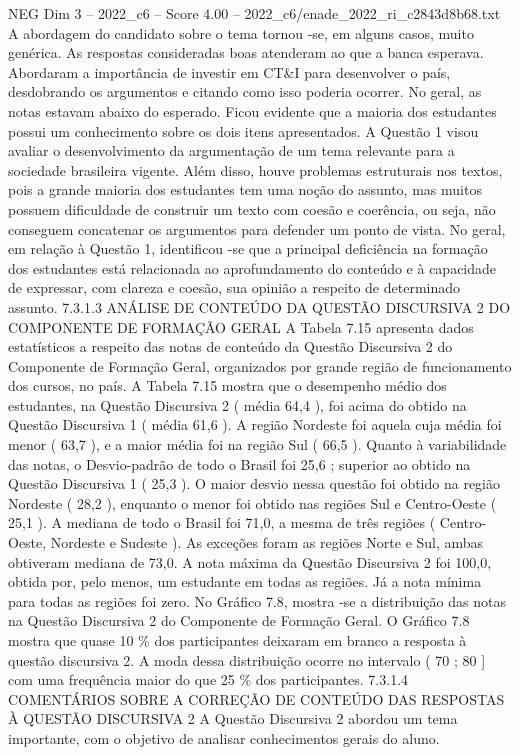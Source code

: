 \begin{textsample}{NEG Dim 3 – 2022\_c6 – Score 4.00 – 2022\_c6/enade\_2022\_ri\_c2843d8b68.txt}
A abordagem do candidato sobre o tema tornou -se, em alguns casos, muito genérica.
As respostas consideradas boas atenderam ao que a banca esperava.
Abordaram a importância de investir em CT\&I para desenvolver o país, desdobrando os argumentos e citando como isso poderia ocorrer.
No geral, as notas estavam abaixo do esperado.
Ficou evidente que a maioria dos estudantes possui um conhecimento sobre os dois itens apresentados.
A Questão 1 visou avaliar o desenvolvimento da argumentação de um tema relevante para a sociedade brasileira vigente.
Além disso, houve problemas estruturais nos textos, pois a grande maioria dos estudantes tem uma noção do assunto, mas muitos possuem dificuldade de construir um texto com coesão e coerência, ou seja, não conseguem concatenar os argumentos para defender um ponto de vista.
No geral, em relação à Questão 1, identificou -se que a principal deficiência na formação dos estudantes está relacionada ao aprofundamento do conteúdo e à capacidade de expressar, com clareza e coesão, sua opinião a respeito de determinado assunto. 7.3.1.3 ANÁLISE DE CONTEÚDO DA QUESTÃO DISCURSIVA 2 DO COMPONENTE DE FORMAÇÃO GERAL A Tabela 7.15 apresenta dados estatísticos a respeito das notas de conteúdo da Questão Discursiva 2 do Componente de Formação Geral, organizados por grande região de funcionamento dos cursos, no país.
A Tabela 7.15 mostra que o desempenho médio dos estudantes, na Questão Discursiva 2 ( média 64,4 ), foi acima do obtido na Questão Discursiva 1 ( média 61,6 ).
A região Nordeste foi aquela cuja média foi menor ( 63,7 ), e a maior média foi na região Sul ( 66,5 ).
Quanto à variabilidade das notas, o Desvio-padrão de todo o Brasil foi 25,6 ; superior ao obtido na Questão Discursiva 1 ( 25,3 ).
O maior desvio nessa questão foi obtido na região Nordeste ( 28,2 ), enquanto o menor foi obtido nas regiões Sul e Centro-Oeste ( 25,1 ).
A mediana de todo o Brasil foi 71,0, a mesma de três regiões ( Centro-Oeste, Nordeste e Sudeste ).
As exceções foram as regiões Norte e Sul, ambas obtiveram mediana de 73,0.
A nota máxima da Questão Discursiva 2 foi 100,0, obtida por, pelo menos, um estudante em todas as regiões.
Já a nota mínima para todas as regiões foi zero.
No Gráfico 7.8, mostra -se a distribuição das notas na Questão Discursiva 2 do Componente de Formação Geral.
O Gráfico 7.8 mostra que quase 10 \% dos participantes deixaram em branco a resposta à questão discursiva 2.
A moda dessa distribuição ocorre no intervalo ( 70 ; 80 ] com uma frequência maior do que 25 \% dos participantes. 7.3.1.4 COMENTÁRIOS SOBRE A CORREÇÃO DE CONTEÚDO DAS RESPOSTAS À QUESTÃO DISCURSIVA 2 A Questão Discursiva 2 abordou um tema importante, com o objetivo de analisar conhecimentos gerais do aluno.

\end{textsample}
